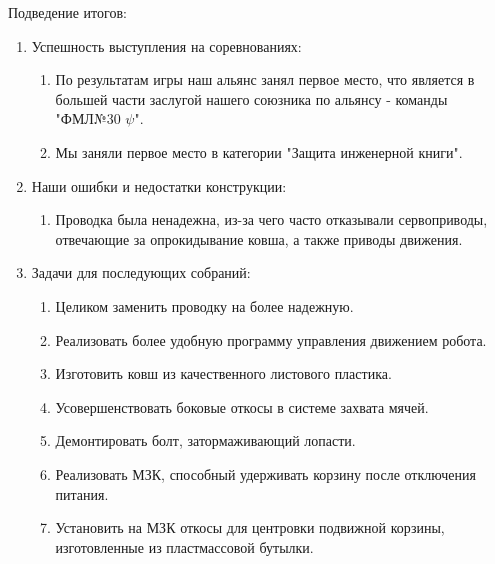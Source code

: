 Подведение итогов:
\begin{enumerate}
  \item Успешность выступления на соревнованиях:
  \begin{enumerate}
	\item По результатам игры наш альянс занял первое место, что является в большей части заслугой нашего союзника по альянсу - команды "ФМЛ№30 ${\psi}$".
	
	\item Мы заняли первое место в категории "Защита инженерной книги".
	
  \end{enumerate}
  
  \item Наши ошибки и недостатки конструкции:
  \begin{enumerate}
  	\item Проводка была ненадежна, из-за чего часто отказывали сервоприводы, отвечающие за опрокидывание ковша, а также приводы движения.
  	
  \end{enumerate}
  
  \item Задачи для последующих собраний:
  \begin{enumerate}
  	\item Целиком заменить проводку на более надежную.
  	
  	\item Реализовать более удобную программу управления движением робота.
  	
  	\item Изготовить ковш из качественного листового пластика.
  	
  	\item Усовершенствовать боковые откосы в системе захвата мячей.
  	
  	\item Демонтировать болт, затормаживающий лопасти.
  	
  	\item Реализовать МЗК, способный удерживать корзину после отключения питания.
  	  	
  	\item Установить на МЗК откосы для центровки подвижной корзины, изготовленные из пластмассовой бутылки.
  	
  \end{enumerate}
  
\end{enumerate}
\fillpage